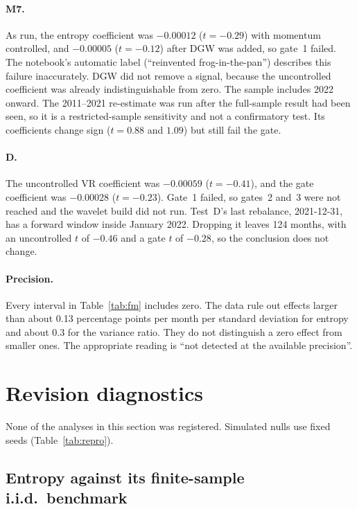 \documentclass[11pt]{article}
\begin{document}
\paragraph{M7.} As run, the entropy coefficient was $-0.00012$ ($t=-0.29$) with momentum
controlled, and $-0.00005$ ($t=-0.12$) after DGW was added, so gate~1 failed. The
notebook's automatic label (``reinvented frog-in-the-pan'') describes this failure
inaccurately. DGW did not remove a signal, because the uncontrolled coefficient was already
indistinguishable from zero. The sample includes 2022 onward. The 2011--2021 re-estimate
was run after the full-sample result had been seen, so it is a restricted-sample
sensitivity and not a confirmatory test. Its coefficients change sign ($t=0.88$ and $1.09$)
but still fail the gate.

\paragraph{D.} The uncontrolled VR coefficient was $-0.00059$ ($t=-0.41$), and the gate
coefficient was $-0.00028$ ($t=-0.23$). Gate~1 failed, so gates~2 and~3 were not
reached and the wavelet build did not run. Test~D's last rebalance, 2021-12-31, has a
forward window inside January 2022. Dropping it leaves 124 months, with an uncontrolled
$t$ of $-0.46$ and a gate $t$ of $-0.28$, so the conclusion does not change.

\paragraph{Precision.} Every interval in Table~\ref{tab:fm} includes zero. The data rule
out effects larger than about 0.13 percentage points per month per standard deviation for
entropy and about 0.3 for the variance ratio. They do not distinguish a zero effect from
smaller ones. The appropriate reading is ``not detected at the available precision''.

\section{Revision diagnostics}
\label{sec:diag}

None of the analyses in this section was registered. Simulated nulls use fixed seeds
(Table~\ref{tab:repro}).

\subsection{Entropy against its finite-sample i.i.d.\ benchmark}
\end{document}
